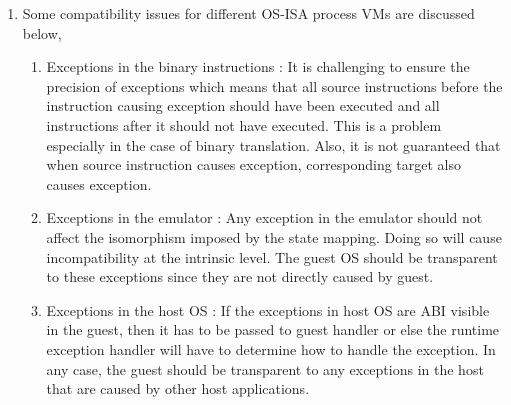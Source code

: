 \documentclass[11pt,a4paper,oneside]{article}
\begin{document}
\begin{enumerate}
		\item Some compatibility issues for different OS-ISA process VMs are discussed below,
			\begin{enumerate}
				\item Exceptions in the binary instructions : It is challenging to ensure the precision of exceptions which means that all source instructions before the instruction causing exception should have been executed and all instructions after it should not have executed. This is a problem especially in the case of binary translation. Also, it is not guaranteed that when source instruction causes exception, corresponding target also causes exception.
				\item Exceptions in the emulator : Any exception in the emulator should not affect the isomorphism imposed by the state mapping. Doing so will cause incompatibility at the intrinsic level. The guest OS should be transparent to these exceptions since they are not directly caused by guest.
				\item Exceptions in the host OS : If the exceptions in host OS are ABI visible in the guest, then it has to be passed to guest handler or else the runtime exception handler will have to determine how to handle the exception. In any case, the guest should be transparent to any exceptions in the host that are caused by other host applications. 
			\end{enumerate}
		

\end{enumerate}
\end{document}
